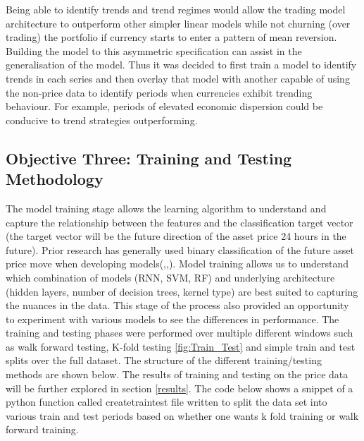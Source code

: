 \documentclass[11pt]{article}
\begin{document}
Being able to identify trends and trend regimes would allow the trading model architecture to outperform other simpler linear models while not churning (over trading) the portfolio if currency starts to enter a pattern of mean reversion. Building the model to this asymmetric specification can assist in the generalisation of the model. \newline Thus it was decided to first train a model to identify trends in each series and then overlay that model with another capable of using the non-price data to identify periods when currencies exhibit trending behaviour. For example, periods of elevated economic dispersion could be conducive to trend strategies outperforming.

\subsection{Objective Three: Training and Testing Methodology}
The model training stage allows the learning algorithm to understand and capture the relationship between the features and the classification target vector (the target vector will be the future direction of the asset price 24 hours in the future). Prior research has generally used binary classification of the future asset price move when developing models(\cite{Abreu2018},\cite{Gunduz2017},\cite{Chatzis2018}). \newline Model training allows us to understand which combination of models (RNN, SVM, RF) and underlying architecture (hidden layers, number of decision trees, kernel type) are best suited to capturing the nuances in the data. This stage of the process also provided an opportunity to experiment with various models to see the differences in performance. The training and testing phases were performed over multiple different windows such as walk forward testing, K-fold testing \ref{fig:Train_Test} and simple train and test splits over the full dataset. The structure of the different training/testing methods are shown below. The results of training and testing on the price data will be further explored in section \ref{results}. The code below shows a snippet of a python function called create\textunderscore train\textunderscore  test file written to split the data set into various train and test periods based on whether one wants k fold training or walk forward training.
\end{document}
